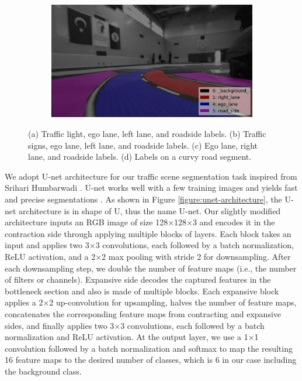 \begin{figure}[h]
\begin{subfigure}[b]{0.4\linewidth}
    \caption{}
  \end{subfigure}
  \begin{subfigure}[b]{0.4\linewidth}
    \includegraphics[width=\linewidth]{figures/label-visualization4.jpg}
    \caption{}
  \end{subfigure}
  \caption[Visualization of semantic segmentation labels]{(a) Traffic light,
    ego lane, left lane, and roadside labels. (b) Traffic signs, ego lane, left
    lane, and roadside labels. (c) Ego lane, right lane, and roadside labels.
    (d) Labels on a curvy road segment.}
  \label{figure:label-visualization}
\end{figure}

We adopt U-net architecture for our traffic scene segmentation task inspired
from Srihari Humbarwadi \cite{Srihari2018SS}. U-net works well with a few
training images and yields fast and precise segmentations
\cite{Ronneberger2015UNetCN}. As shown in Figure
\ref{figure:unet-architecture}, the U-net architecture is in shape of U, thus
the name U-net. Our slightly modified architecture inputs an RGB image of size
128$\times$128$\times$3 and encodes it in the contraction side through applying
multiple blocks of layers. Each block takes an input and applies two 3$\times$3
convolutions, each followed by a batch normalization, ReLU activation, and a
2$\times$2 max pooling with stride 2 for downsampling. After each downsampling
step, we double the number of feature maps (i.e., the number of filters or
channels). Expansive side decodes the captured features in the bottleneck
section and also is made of multiple blocks. Each expansive block applies a
2$\times$2 up-convolution for upsampling, halves the number of feature maps,
concatenates the corresponding feature maps from contracting and expansive
sides, and finally applies two 3$\times$3 convolutions, each followed by a
batch normalization and ReLU activation. At the output layer, we use a
1$\times$1 convolution followed by a batch normalization and softmax to map the
resulting 16 feature maps to the desired number of classes, which is 6 in our
case including the background class.

